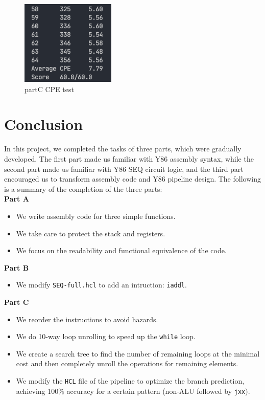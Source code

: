 \documentclass{article}
\begin{document}
\begin{figure}[H] %
        \centering %
        \includegraphics[width=0.4\textwidth]{partC-CPE-test.png} %
        \caption{partC CPE test} %
        \label{Fig.partC-CPE} %
\end{figure}
\section{Conclusion}
In this project, we completed the tasks of three parts, which were gradually developed. The first part made us familiar with Y86 assembly syntax, while the second part made us familiar with Y86 SEQ circuit logic, and the third part encouraged us to transform assembly code and Y86 pipeline design.
The following is a summary of the completion of the three parts:\\
\textbf{Part A}
\begin{itemize}
        \item We write assembly code for three simple functions.
        \item We take care to protect the stack and registers.
        \item We focus on the readability and functional equivalence of the code.
\end{itemize}
\textbf{Part B}
\begin{itemize}
        \item We modify \texttt{SEQ-full.hcl} to add an intruction: \texttt{iaddl}.
\end{itemize}
\textbf{Part C}
\begin{itemize}
        \item We reorder the instructions to avoid hazards.
        \item We do 10-way loop unrolling to speed up the \texttt{while} loop.
        \item We create a search tree to find the number of remaining loops at the minimal cost and then completely unroll the operations for remaining elements.
        \item We modify the \texttt{HCL} file of the pipeline to optimize the branch prediction,  achieving 100\% accuracy for a certain pattern (non-ALU followed by \texttt{jxx}).
\end{itemize}
\end{document}
